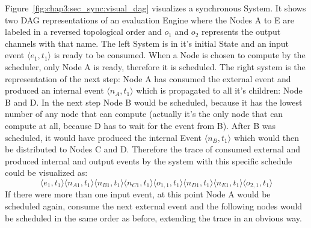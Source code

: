 Figure~\ref{fig:chap3:sec_sync:visual_dag} visualizes a synchronous System.
It shows two DAG representations of an evaluation Engine  where the Nodes A to E are labeled in a reversed topological order and \(o_1\) and \(o_2\) represents the output channels with that name.
The left System is in it's initial State and an input event \(\langle e_1,t_1\rangle\) is ready to be consumed.
When a Node is chosen to compute by the scheduler, only Node A is ready, therefore it is scheduled.
The right system is the representation of the next step: Node A has consumed the external event and produced an internal event \(\langle n_A,t_1\rangle\) which is propagated to all it's children: Node B and D.
In the next step Node B would be scheduled, because it has the lowest number of any node that can compute (actually it's the only node that can compute at all, because D has to wait for the event from B).
After B was scheduled, it would have produced the internal Event \(\langle n_B,t_1\rangle\) which would then be distributed to Nodes C and D.
Therefore the trace of consumed external and produced internal and output events by the system with this specific schedule could be visualized as: %
\[
  \langle e_1,t_1 \rangle \langle n_{A1},t_1 \rangle \langle n_{B1},t_1 \rangle \langle n_{C1},t_1 \rangle \langle o_{1,1},t_1 \rangle \langle n_{D1},t_1 \rangle \langle n_{E1},t_1 \rangle \langle o_{2,1},t_1 \rangle
\]
If there were more than one input event, at this point Node A would be scheduled again, consume the next external event and the following nodes would be scheduled in the same order as before,
extending the trace in an obvious way.

